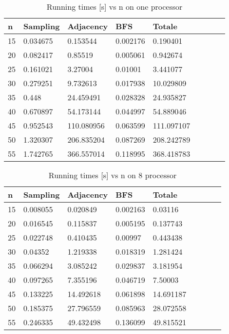 \begin{table}[h!] 
\centering
\caption{Running times [s] vs n on one processor\label{fig:runtimes1}}
\begin{tabular}{|l|l|l|l|l|l|l|l|l|}
\hline
n&	Sampling&	Adjacency&	BFS&			Totale  \\ \hline
15&	0.034675	&	0.153544	&	0.002176	&	0.190401\\
20&	0.082417	&	0.85519	&	0.005061	&	0.942674\\
25&	0.161021	&	3.27004	&	0.01001	&	3.441077\\
30&	0.279251	&	9.732613	&	0.017938	&	10.029809\\
35&	0.448	&	24.459491&	0.028328	&	24.935827\\
40&	0.670897	&	54.173144&	0.044997	&	54.889046\\
45&	0.952543	&	110.080956&	0.063599	&	111.097107\\
50&	1.320307	&	206.835204&	0.087269	&	208.242789\\
55&	1.742765	&	366.557014&	0.118995	&	368.418783\\
\hline
\end{tabular}
\end{table}



\begin{table}[h!] 
\centering
\caption{Running times [s] vs n on 8 processor\label{fig:runtimes8}}
\begin{tabular}{|l|l|l|l|l|l|l|l|l|}
\hline
n&	Sampling&	Adjacency&	BFS&			Totale  \\ \hline
15&	0.008055	&	0.020849	&	0.002163	&	0.03116\\
20&	0.016545	&	0.115837	&	0.005195	&	0.137743\\
25&	0.022748	&	0.410435	&	0.00997	&	0.443438\\
30&	0.04352	&	1.219338	&	0.018319	&	1.281424\\
35&	0.066294	&	3.085242	&	0.029837	&	3.181954\\
40&	0.097265	&	7.355196	&	0.046719	&	7.50003\\
45&	0.133225	&	14.492618&	0.061898	&	14.691187\\
50&	0.185375	&	27.796559&	0.085963	&	28.072558\\
55&	0.246335	&	49.432498&	0.136099	&	49.815521\\
\hline
\end{tabular}
\end{table}



